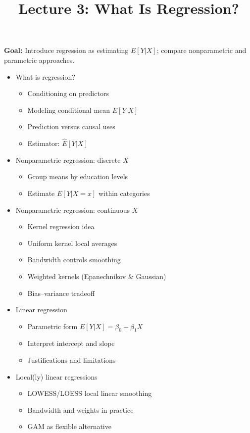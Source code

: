 \documentclass[12pt]{article}
\title{\Large Lecture 3: What Is Regression?}
\author{}
\date{}
\begin{document}
\maketitle
\vspace{-6em}

\noindent \textbf{Goal:} Introduce regression as estimating $E[Y|X]$; compare nonparametric and parametric approaches.\medskip

\begin{itemize}\setlength{\itemsep}{1em}
\item What is regression?
\begin{itemize}
\item Conditioning on predictors
\item Modeling conditional mean $E[Y|X]$
\item Prediction versus causal uses
\item Estimator: $\widehat{E}[Y|X]$
\end{itemize}
\item Nonparametric regression: discrete $X$
\begin{itemize}
\item Group means by education levels
\item Estimate $E[Y|X=x]$ within categories
\end{itemize}
\item Nonparametric regression: continuous $X$
\begin{itemize}
\item Kernel regression idea
\item Uniform kernel local averages
\item Bandwidth controls smoothing
\item Weighted kernels (Epanechnikov \& Gaussian)
\item Bias–variance tradeoff
\end{itemize}
\item Linear regression
\begin{itemize}
\item Parametric form $E[Y|X]=\beta_0+\beta_1 X$
\item Interpret intercept and slope
\item Justifications and limitations
\end{itemize}
\item Local(ly) linear regressions
\begin{itemize}
\item LOWESS/LOESS local linear smoothing
\item Bandwidth and weights in practice
\item GAM as flexible alternative
\end{itemize}
\end{itemize}
\end{document}
